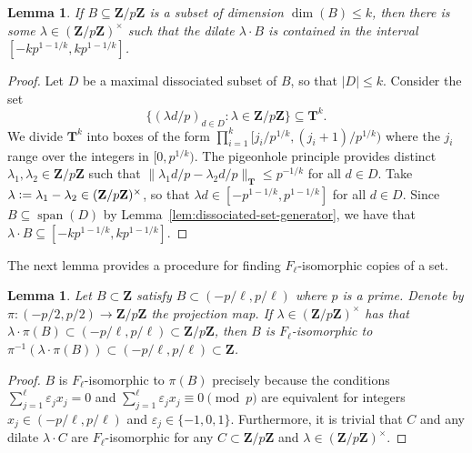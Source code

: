 \documentclass[11pt, reqno]{amsart}
\newtheorem{lemma}[theorem]{Lemma}
\begin{document}
\begin{lemma}\label{lem:small-dim-rectification}
If $B \subseteq \mathbf{Z}/p\mathbf{Z}$ is a subset of dimension $\dim(B)\leqslant k$, then there is some $\lambda \in (\mathbf{Z}/p\mathbf{Z})^\times$ such that the dilate $\lambda\cdot B$ is contained in the interval $[-kp^{1-1/k},kp^{1-1/k}]$.
\end{lemma}

\begin{proof}
Let $D$ be a maximal dissociated subset of $B$, so that $|D|\leqslant k$. Consider the set
$$\{(\lambda d/p)_{d\in D}: \lambda \in \mathbf{Z}/p\mathbf{Z}\} \subseteq \mathbf{T}^{k}.$$
We divide $\mathbf{T}^{k}$ into boxes of the form $\prod_{i=1}^k[j_i/p^{1/k},(j_i+1)/p^{1/k})$ where the $j_i$ range over the integers in $[0,p^{1/k})$. The pigeonhole principle provides distinct $\lambda_1, \lambda_2 \in \mathbf{Z}/p\mathbf{Z}$ such that $\|\lambda_1 d/p-\lambda_2 d/p\|_{\mathbf{T}} \leqslant p^{-1/k}$ for all $d\in D$.  Take $\lambda\vcentcolon=\lambda_1-\lambda_2 \in (\mathbf{Z}/p\mathbf{Z})^\times$, so that $\lambda d \in [-p^{1-1/k},p^{1-1/k}]$ for all $d\in D$.  Since $B\subseteq \operatorname{span}(D)$ by Lemma~\ref{lem:dissociated-set-generator}, we have that
$\lambda \cdot B \subseteq [-kp^{1-1/k},kp^{1-1/k}].$
\end{proof}
The next lemma provides a procedure for finding $F_\ell$-isomorphic copies of a set.
\begin{lemma}\label{lem:dilating}
    Let $B\subset\mathbf{Z}$ satisfy $B\subset(-p/\ell,p/\ell)$ where $p$ is a prime. Denote by $\pi:(-p/2,p/2)\to\mathbf{Z}/p\mathbf{Z}$ the projection map. If $\lambda\in(\mathbf{Z}/p\mathbf{Z})^\times$ has that $\lambda\cdot \pi(B)\subset(-p/\ell,p/\ell)\subset\mathbf{Z}/p\mathbf{Z}$, then $B$ is $F_\ell$-isomorphic to $\pi^{-1}(\lambda\cdot\pi(B))\subset(-p/\ell,p/\ell)\subset\mathbf{Z}$.
\end{lemma}
\begin{proof}
    $B$ is $F_\ell$-isomorphic to $\pi(B)$ precisely because the conditions $\sum_{j=1}^\ell \varepsilon_jx_j=0$ and $\sum_{j=1}^\ell \varepsilon_jx_j\equiv 0 \pmod p$ are equivalent for integers $x_j\in (-p/\ell,p/\ell)$ and $\varepsilon_j\in\{-1,0,1\}$. Furthermore, it is trivial that $C$ and any dilate $\lambda\cdot C$ are $F_\ell$-isomorphic for any $C\subset\mathbf{Z}/p\mathbf{Z}$ and $\lambda\in(\mathbf{Z}/p\mathbf{Z})^\times$.
\end{proof}
\end{document}
